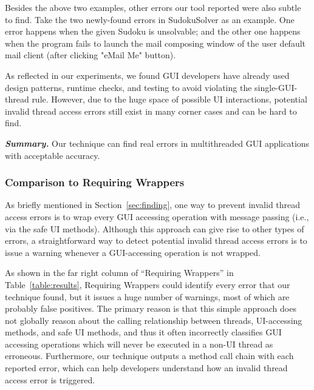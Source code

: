 Besides the above two examples, other errors our tool reported were also
subtle to find. Take the two newly-found errors in SudokuSolver
as an example. One error happens when
the given Sudoku is unsolvable; and the other one happens
when the program fails to launch the mail composing window of the
user default mail client (after clicking "eMail Me" button).

As reflected in our experiments, we found GUI developers have already
used design patterns, runtime checks, and testing to avoid violating
the single-GUI-thread rule. However, due to the huge space of
possible UI interactions, potential
invalid thread access errors still exist in many corner cases and
can be hard to find. 


\vspace{1mm}

\noindent \textbf{\textit{Summary.}} Our technique can find real errors
in multithreaded GUI applications with
acceptable accuracy.

\subsubsection{Comparison to Requiring Wrappers}
\label{sec:straightforward}

As briefly mentioned in Section~\ref{sec:finding}, one way to prevent
invalid thread access errors is to wrap every GUI accessing operation
with message passing (i.e., via the safe UI methods). Although
this approach can give rise to other types of errors, a
straightforward way to detect potential invalid thread access errors
is to issue a warning whenever a GUI-accessing operation
is not wrapped. 

As shown in the far right column of ``Requiring Wrappers'' in
Table~\ref{table:results}, Requiring Wrappers could identify every
error that our technique found, but it issues a huge number of warnings,
most of which are probably false positives.
The primary reason is that this simple approach
does not globally reason about the calling relationship between
threads, UI-accessing methods, and safe UI methods, and thus it often incorrectly
classifies GUI accessing operations which will never be executed
in a non-UI thread as erroneous. Furthermore, our technique
outputs a method call chain with each reported error, which can help
developers understand how an invalid thread access error is triggered.



